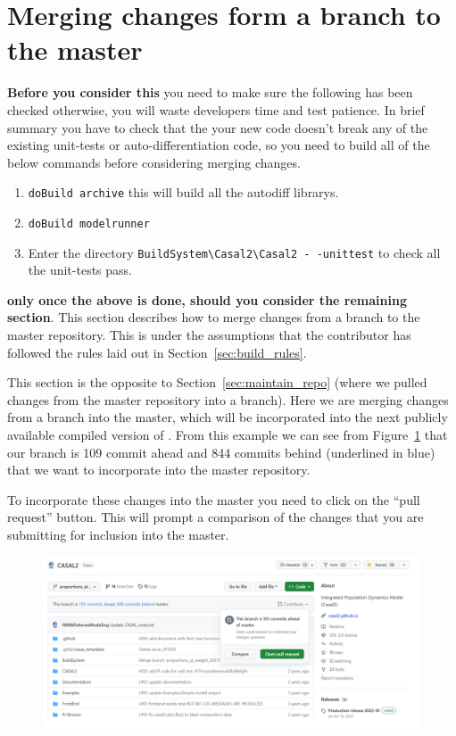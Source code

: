 \section{Merging changes form a branch to the master\label{sec:pull_requests}}

\textbf{Before you consider this} you need to make sure the following has been checked otherwise, you will waste developers time and test patience. In brief summary you have to check that the your new code doesn't break any of the existing unit-tests or auto-differentiation code, so you need to build all of the below commands before considering merging changes.

\begin{enumerate}
\item \texttt{doBuild archive} this will build all the autodiff librarys.
\item \texttt{doBuild modelrunner}
\item Enter the directory  \texttt{BuildSystem\textbackslash Casal2\textbackslash Casal2 - -unittest} to check all the unit-tests pass.
			
\end{enumerate}


\textbf{only once the above is done, should you consider the remaining section}. This section describes how to merge changes from a branch to the master repository. This is under the assumptions that the contributor has followed the rules laid out in Section~\ref{sec:build_rules}. 

This section is the opposite to Section~\ref{sec:maintain_repo} (where we pulled changes from the master repository into a branch). Here we are merging changes from a branch into the master, which will be incorporated into the next publicly available compiled version of \CNAME. From this example we can see from Figure~\ref{fig:fork_merge1} that our branch is 109 commit ahead and 844 commits behind (underlined in blue) that we want to incorporate into the master repository.

To incorporate these changes into the master you need to click on the \enquote{pull request} button. This will prompt a comparison of the changes that you are submitting for inclusion into the master.
\clearpage
\begin{figure}[!ht]
	\centering
	\includegraphics[scale=0.4]{Figures/create_pull_request.png}
	\caption{}\label{fig:fork_merge1}
\end{figure}

